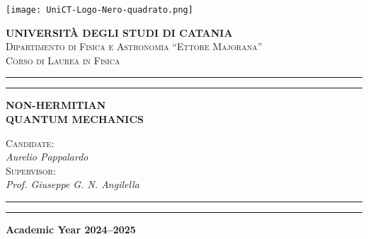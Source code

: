 \newcommand{\unictsize}{0.3\textwidth}
\newcommand{\dfasize}{0.6\textwidth}
\newcommand{\namesize}{0.8\textwidth}
\newcommand{\doublerule}{\hrule \vspace{3pt} \hrule}

\begin{titlingpage}
    \begin{center}
        \begin{minipage}[h!]{\linewidth}
            \begin{minipage}[ht!]{\linewidth}
                \centering
                \texttt{[image: UniCT-Logo-Nero-quadrato.png]}
            \end{minipage}
            \centering\large
            \textbf{UNIVERSITÀ DEGLI STUDI DI CATANIA}
            \\[5pt]
            \normalsize
            \textsc{Dipartimento di Fisica e Astronomia ``Ettore Majorana''}
            \\[5pt]
            \textsc{Corso di Laurea in Fisica}
            \\[10pt]
            \doublerule
        \end{minipage}
        \vfill
        {\Huge\bfseries NON-HERMITIAN\\[10pt]QUANTUM MECHANICS}%
        \vfill
        \centering
        \large
        \begin{minipage}[h]{\namesize}
            \raggedleft
            \textsc{Candidate:}\\
            \textit{Aurelio Pappalardo}
            \\[10pt]
            \textsc{Supervisor:}\\
            \textit{Prof. Giuseppe G. N. Angilella}
        \end{minipage}
        \vspace{30pt}
        \doublerule
        \vspace{10pt}
        \normalsize
        \textbf{Academic Year 2024--2025}
    \end{center}
\end{titlingpage}
\restoregeometry